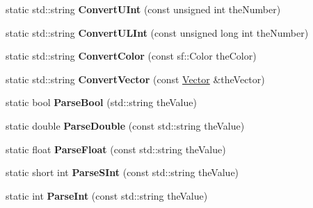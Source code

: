 \begin{DoxyCompactItemize}
\item 
\hypertarget{classStringUtils_a1473cfb8fbac6242db68850ff6198626}{static std\-::string {\bfseries Convert\-U\-Int} (const unsigned int the\-Number)}\label{classStringUtils_a1473cfb8fbac6242db68850ff6198626}

\item 
\hypertarget{classStringUtils_a714f5a4ca716f81e62e838b42a42de1b}{static std\-::string {\bfseries Convert\-U\-L\-Int} (const unsigned long int the\-Number)}\label{classStringUtils_a714f5a4ca716f81e62e838b42a42de1b}

\item 
\hypertarget{classStringUtils_a696c2867bce6acd98dbf45455c02c711}{static std\-::string {\bfseries Convert\-Color} (const sf\-::\-Color the\-Color)}\label{classStringUtils_a696c2867bce6acd98dbf45455c02c711}

\item 
\hypertarget{classStringUtils_a9dd2d1ab56ae55566850b25a4ea8c8c1}{static std\-::string {\bfseries Convert\-Vector} (const \hyperlink{classVector}{Vector} \&the\-Vector)}\label{classStringUtils_a9dd2d1ab56ae55566850b25a4ea8c8c1}

\item 
\hypertarget{classStringUtils_a1a1611970c8d17f42edd437c87a5be47}{static bool {\bfseries Parse\-Bool} (std\-::string the\-Value)}\label{classStringUtils_a1a1611970c8d17f42edd437c87a5be47}

\item 
\hypertarget{classStringUtils_aa347d57cb232f4d8de8aa2a198b84ca2}{static double {\bfseries Parse\-Double} (const std\-::string the\-Value)}\label{classStringUtils_aa347d57cb232f4d8de8aa2a198b84ca2}

\item 
\hypertarget{classStringUtils_acac584869fae0146720cdbd4b8eb0274}{static float {\bfseries Parse\-Float} (const std\-::string the\-Value)}\label{classStringUtils_acac584869fae0146720cdbd4b8eb0274}

\item 
\hypertarget{classStringUtils_a21def115ad49839722347efb568ca0b3}{static short int {\bfseries Parse\-S\-Int} (const std\-::string the\-Value)}\label{classStringUtils_a21def115ad49839722347efb568ca0b3}

\item 
\hypertarget{classStringUtils_ad6300ed2506a6543aad2ddea10e9c44e}{static int {\bfseries Parse\-Int} (const std\-::string the\-Value)}\label{classStringUtils_ad6300ed2506a6543aad2ddea10e9c44e}


\end{DoxyCompactItemize}

